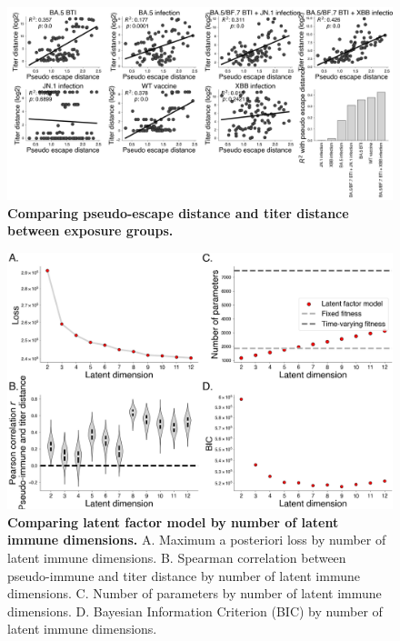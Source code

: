\documentclass[11pt,oneside,letterpaper]{article}
\begin{document}
\begin{figure}[t!]
    \centering
    \includegraphics[width=1.0\textwidth=0.01]{./supplementary_figures/titer_pseudo_escape_distance_by_group.png}
    \caption{
        \textbf{Comparing pseudo-escape distance and titer distance between exposure groups.}
    }
    \label{fig:titer_distance_correlations_by_group}
\end{figure}

\begin{figure}[t!]
    \centering
    \includegraphics[width=1.0\textwidth=0.01]{./supplementary_figures/loss_by_latent_dimension.png}
    \caption{
      \textbf{Comparing latent factor model by number of latent immune dimensions.}
      A. Maximum a posteriori loss by number of latent immune dimensions.
      B. Spearman correlation between pseudo-immune and titer distance by number of latent immune dimensions.
      C. Number of parameters by number of latent immune dimensions.
      D. Bayesian Information Criterion (BIC) by number of latent immune dimensions.
    }
    \label{fig:latent_factor_dimension}
\end{figure}
\end{document}
